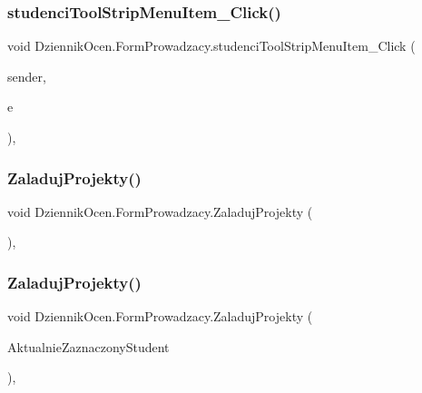 \subsubsection{\texorpdfstring{studenci\+Tool\+Strip\+Menu\+Item\+\_\+\+Click()}{studenciToolStripMenuItem\_Click()}}
{\footnotesize\ttfamily void Dziennik\+Ocen.\+Form\+Prowadzacy.\+studenci\+Tool\+Strip\+Menu\+Item\+\_\+\+Click (\begin{DoxyParamCaption}\item[{object}]{sender,  }\item[{Event\+Args}]{e }\end{DoxyParamCaption})\hspace{0.3cm}{\ttfamily [inline]}, {\ttfamily [private]}}

\mbox{\label{class_dziennik_ocen_1_1_form_prowadzacy_a27f7245c5c86426b35219a4d0850a05c}} 
\subsubsection{\texorpdfstring{Zaladuj\+Projekty()}{ZaladujProjekty()}\hspace{0.1cm}{\footnotesize\ttfamily [1/2]}}
{\footnotesize\ttfamily void Dziennik\+Ocen.\+Form\+Prowadzacy.\+Zaladuj\+Projekty (\begin{DoxyParamCaption}{ }\end{DoxyParamCaption})\hspace{0.3cm}{\ttfamily [inline]}, {\ttfamily [private]}}

\mbox{\label{class_dziennik_ocen_1_1_form_prowadzacy_a695f645edeabba811779292326e73f02}} 
\subsubsection{\texorpdfstring{Zaladuj\+Projekty()}{ZaladujProjekty()}\hspace{0.1cm}{\footnotesize\ttfamily [2/2]}}
{\footnotesize\ttfamily void Dziennik\+Ocen.\+Form\+Prowadzacy.\+Zaladuj\+Projekty (\begin{DoxyParamCaption}\item[{\hyperlink{class_dziennik_ocen_1_1_s_t_u_d_e_n_t}{S\+T\+U\+D\+E\+NT}}]{Aktualnie\+Zaznaczony\+Student }\end{DoxyParamCaption})\hspace{0.3cm}{\ttfamily [inline]}, {\ttfamily [private]}}

